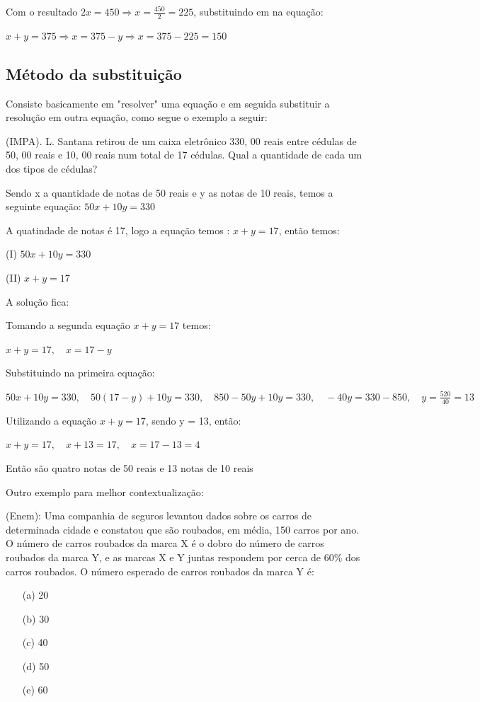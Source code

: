 \begin{multicols*}{2}
\begin{tikzpicture}[x=0.75pt,y=0.75pt,yscale=-1,xscale=1]
    \end{tikzpicture}

    Com o resultado $2x = 450 \Rightarrow x = \frac{450}{2} = 225$, substituindo em na equação:

    $x+y = 375 \Rightarrow x = 375 - y \Rightarrow x = 375 - 225 = 150$

    \subsection{Método da substituição}
    Consiste basicamente em "resolver" uma equação e em seguida substituir a resolução em outra 			equação, como segue o exemplo a seguir:

    (IMPA). L. Santana retirou de um caixa eletrônico 330, 00 reais entre cédulas de 50, 00 reais e 		10, 00 reais num total de 17 cédulas. Qual a quantidade de cada um dos tipos de cédulas?

    Sendo x a quantidade de notas de 50 reais e y as notas de 10 reais, temos a seguinte equação:
    $50x + 10y = 330$

    A quatindade de notas é 17, logo a equação temos : $x + y = 17$, então temos:

    (I) $50x + 10y = 330$

    (II) $x + y = 17$

    A solução fica:

    Tomando a segunda equação $x + y = 17$ temos:

    $x + y = 17, \quad x = 17 - y$

    Substituindo na primeira equação:

    $50x + 10y = 330, \quad 50(17 - y) + 10y = 330, \quad 850 - 50y + 10y = 330, \quad
        -40y = 330 - 850, \quad y = \frac{520}{40} = 13$

    Utilizando a equação $x + y = 17$, sendo y = 13, então:

    $x + y = 17, \quad x + 13 = 17, \quad x = 17 - 13 = 4$

    Então são quatro notas de 50 reais e 13 notas de 10 reais

    Outro exemplo para melhor contextualização:

    (Enem): Uma companhia de seguros levantou dados sobre os carros de determinada cidade e 				constatou que são roubados, em média, 150 carros por ano. O número de carros roubados da marca 			X é o dobro do número de carros roubados da marca Y, e as marcas X e Y juntas respondem por 			cerca de 60\% dos carros roubados. O número esperado de carros roubados da marca Y é:
    \begin{itemize}
        \item[(a)] 20
        \item[(b)] 30
        \item[(c)] 40
        \item[(d)] 50
        \item[(e)] 60
    \end{itemize}


\end{multicols*}
